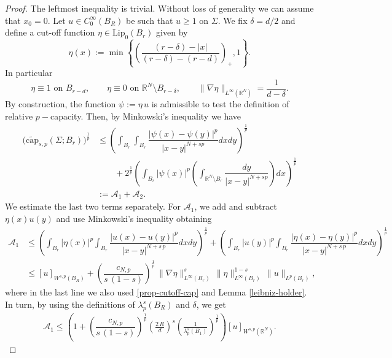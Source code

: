\documentclass[10pt,a4paper]{amsart}
\begin{document}
\begin{proof}
	The leftmost inequality is trivial. Without loss of generality  we can assume  that $x_0 = 0$. Let $u \in C^\infty_0(B_R)$ be such that $u \geq 1$ on $\Sigma$. We fix $\delta = d/2$ and define a cut-off function $\eta \in \mathrm{Lip}_0(B_{r})$ given by \[
	\eta(x):=\min\left\{\left(\dfrac{(r- \delta) - |x|}{(r-\delta) - (r-d)}\right)_{+}, 1\right\}.
	\]
	In particular 
	\begin{equation} \label{prop-cutoff-cap}
		\eta \equiv 1 \mbox{ on } B_{r-d}, \qquad \eta \equiv 0 \mbox{ on } \mathbb{R}^N \setminus B_{r-\delta}, \qquad \|\nabla \eta\|_{L^\infty(\mathbb{R}^N)} = \dfrac{1}{d -\delta}.
	\end{equation}
	By construction, the function $\psi := \eta\,u$ is admissible to test the definition of relative $p-$capacity. Then, by Minkowski's inequality we have 
	\begin{align*} \nonumber
		\Big(\widetilde{\mathrm{cap}}_{s,p}(\Sigma; B_r)\Big)^{\frac{1}{p}} &\leq \left(\int_{B_r}\int_{B_r} \dfrac{|\psi(x) - \psi(y)|^p}{|x-y|^{N+sp}}dxdy\right)^{\frac{1}{p}} \\&\qquad + 2^{\frac{1}{p}}\left(\int_{B_r} |\psi(x)|^p\left(\int_{\mathbb{R}^N \setminus B_r} \dfrac{dy}{|x-y|^{N+sp}}\right) dx\right)^{\frac{1}{p}} \\
		&:= \mathcal{A}_1 + \mathcal{A}_2.
	\end{align*} 
 We estimate the last two terms separately. For $\mathcal{A}_1$, we add and subtract $\eta(x)u(y)$ and use Minkowski's inequality obtaining
	\begin{align*}
		\mathcal{A}_1 &\leq \left(\int_{B_r} |\eta(x)|^p \int_{B_r}\dfrac{|u(x) - u(y)|^p}{|x-y|^{N+s\,p}} dxdy\right)^{\frac{1}{p}} + \left(\int_{B_r} |u(y)|^p \int_{B_r} \dfrac{|\eta(x) - \eta(y)|^p}{|x-y|^{N+s\,p}} dx dy\right)^{\frac{1}{p}} \\ &\leq
		[u]_{W^{s,p}(B_R)} + \left(\dfrac{c_{N,p}}{s\,(1-s)}\right)^{\frac{1}{p}}\,\|\nabla \eta\|^s_{L^\infty(B_r)}\,\|\eta\|^{1-s}_{L^\infty(B_r)}\,\|u\|_{L^p(B_r)},
	\end{align*}
	where in the last line we also used \eqref{prop-cutoff-cap} and Lemma \ref{leibniz-holder}. In turn, by using the definitions of $\lambda_{p}^s(B_R)$ and $\delta$, we get \begin{align*} 
		\mathcal{A}_1 \le \left(1 + \left(\dfrac{c_{N,p}}{s\,(1-s)}\right)^{\frac{1}{p}} \left(\frac{2\,R}{d}\right)^s \left(\frac{1}{\lambda^s_{p}(B_1)}\right)^{\frac{1}{p}}\right)[u]_{W^{s,p}(\mathbb{R}^N)}. 
	\end{align*}

\end{proof}
\end{document}
